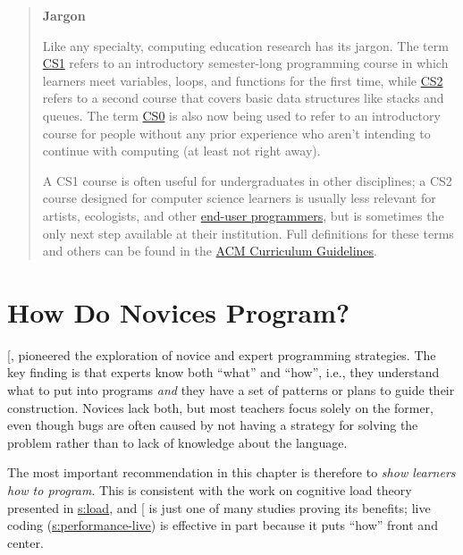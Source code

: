 \begin{quote}\setlength{\parindent}{0pt}
\textbf{Jargon}

Like any specialty, computing education research has its jargon. The
term \protect\hyperlink{g:cs1}{CS1} refers to an introductory semester-long
programming course in which learners meet variables, loops, and
functions for the first time, while \protect\hyperlink{g:cs2}{CS2} refers to
a second course that covers basic data structures like stacks and
queues. The term \protect\hyperlink{g:cs0}{CS0} is also now being used to
refer to an introductory course for people without any prior
experience who aren't intending to continue with computing (at least
not right away).

A CS1 course is often useful for undergraduates in other
disciplines; a CS2 course designed for computer science learners is
usually less relevant for artists, ecologists, and other \protect\hyperlink{g:end-user-programmer}{end-user
programmers}, but is sometimes the only next
step available at their institution. Full definitions for these
terms and others can be found in the \href{https://www.acm.org/education/curricula-recommendations}{ACM Curriculum
Guidelines}.
\end{quote}

\section{How Do Novices Program?}\label{s:pck-programming}

{[},\protect[\hyperlink{b:Solo1986}{Solo1986}]{]} pioneered the exploration of novice and
expert programming strategies. The key finding is that experts know both
``what'' and ``how'', i.e., they understand what to put into programs \emph{and}
they have a set of patterns or plans to guide their construction.
Novices lack both, but most teachers focus solely on the former, even
though bugs are often caused by not having a strategy for solving the
problem rather than to lack of knowledge about the language.

The most important recommendation in this chapter is therefore to \emph{show
learners how to program}. This is consistent with the work on cognitive
load theory presented in \protect\hyperlink{CHAPTER}{s:load}, and {[}\protect[\hyperlink{b:Mull2007b}{Mull2007b}]{]} is
just one of many studies proving its benefits; live coding
(\protect\hyperlink{SECTION}{s:performance-live}) is effective in part because it puts
``how'' front and center.

